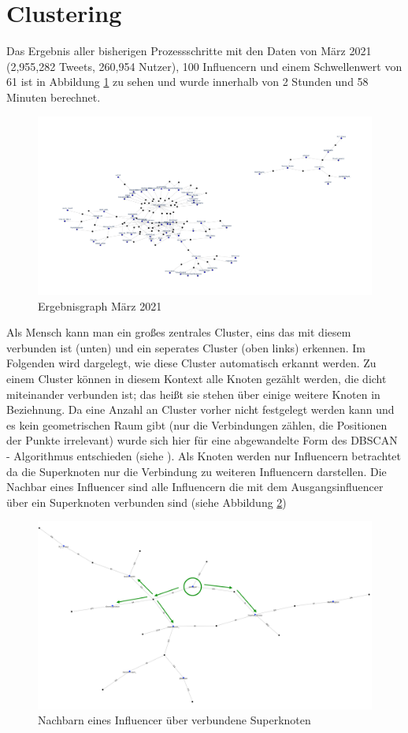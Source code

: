 \section{Clustering}
\label{sec:clutering}
Das Ergebnis aller bisherigen Prozessschritte mit den Daten von März 2021 (2,955,282 Tweets, 260,954 Nutzer), 100 Influencern und einem Schwellenwert von 61 ist in Abbildung \ref{fig:noclusters} zu sehen und wurde innerhalb von 2 Stunden und 58 Minuten berechnet. 
\begin{figure}[h!]
	\centering
	\includegraphics[width=\linewidth]{images/NoClusters}
	\caption{Ergebnisgraph März 2021}
	\label{fig:noclusters}
\end{figure}
Als Mensch kann man ein  großes zentrales \gls{Cluster}, eins das mit diesem verbunden ist (unten) und ein seperates \gls{Cluster} (oben links) erkennen. 
Im Folgenden wird dargelegt, wie diese \gls{Cluster} automatisch erkannt werden.
Zu einem \gls{Cluster} können in diesem Kontext alle Knoten gezählt werden, die dicht miteinander verbunden ist; das heißt sie stehen über einige weitere Knoten in Beziehnung.
Da eine Anzahl an \gls{Cluster} vorher nicht festgelegt werden kann und es kein geometrischen Raum gibt (nur die Verbindungen zählen, die Positionen der Punkte irrelevant) wurde sich hier für eine abgewandelte Form des DBSCAN - Algorithmus entschieden (siehe \cite{dbscan}).
Als Knoten werden nur Influencern betrachtet da die Superknoten nur die Verbindung zu weiteren Influencern darstellen. 
Die Nachbar eines Influencer sind alle Influencern die mit dem Ausgangsinfluencer über ein Superknoten verbunden sind (siehe Abbildung \ref{fig:dbscan-neighbours})
\begin{figure}
	\centering
	\includegraphics[width=0.7\linewidth]{images/DBSCAN-neighbours}
	\caption{Nachbarn eines Influencer über verbundene Superknoten}
	\label{fig:dbscan-neighbours}
\end{figure}
